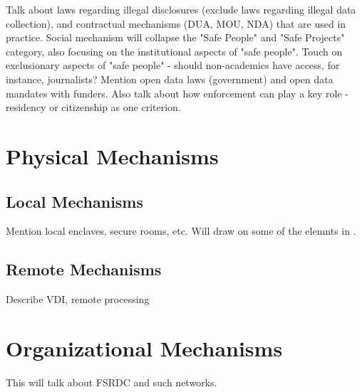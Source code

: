 Talk about laws regarding illegal disclosures (exclude laws regarding illegal data collection), and contractual mechanisms (DUA, MOU, NDA) that are used in practice. Social mechanism will collapse the "Safe People" and "Safe Projects" category, also focusing on the institutional aspects of "safe people". Touch on exclusionary aspects of "safe people" - should non-academics have access, for instance, journalists? Mention open data laws (government) and open data mandates with funders. Also talk about how enforcement can play a key role - residency or citizenship as one criterion.

\section{Physical Mechanisms}

\subsection{Local Mechanisms}

Mention local enclaves, secure rooms, etc. Will draw on some of the elemnts in \cite{cole_handbook_2021,shen_physically_2021}.

\subsection{Remote Mechanisms}

Describe VDI, remote processing

\section{Organizational Mechanisms}

This will talk about FSRDC and such networks.




%

